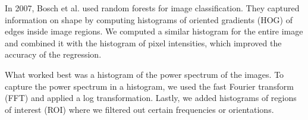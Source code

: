 \documentclass[10pt,conference,compsocconf]{IEEEtran}
\begin{document}
In 2007, Bosch et al.\@ \cite{Bosch} used random forests for image classification. They captured information on shape by computing histograms of oriented gradients (HOG) of edges inside image regions. We computed a similar histogram for the entire image and combined it with the histogram of pixel intensities, which improved the accuracy of the regression.

What worked best was a histogram of the power spectrum of the images. To capture the power spectrum in a histogram, we used the fast Fourier transform (FFT) and applied a log transformation. Lastly, we added histograms of regions of interest (ROI) where we filtered out certain frequencies or orientations.
\end{document}
